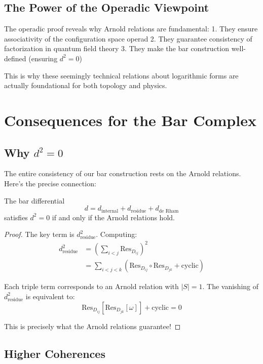 \subsection{The Power of the Operadic Viewpoint}

The operadic proof reveals why Arnold relations are fundamental:
1. They ensure associativity of the configuration space operad
2. They guarantee consistency of factorization in quantum field theory
3. They make the bar construction well-defined (ensuring $d^2 = 0$)

This is why these seemingly technical relations about logarithmic forms are actually foundational for both topology and physics.

\section{Consequences for the Bar Complex}

\subsection{Why $d^2 = 0$}

The entire consistency of our bar construction rests on the Arnold relations. Here's the precise connection:

\begin{theorem}
The bar differential 
$$d = d_{\text{internal}} + d_{\text{residue}} + d_{\text{de Rham}}$$
satisfies $d^2 = 0$ if and only if the Arnold relations hold.
\end{theorem}

\begin{proof}
The key term is $d_{\text{residue}}^2$. Computing:
\begin{align}
d_{\text{residue}}^2 &= \left(\sum_{i<j} \text{Res}_{D_{ij}}\right)^2 \\
&= \sum_{i<j<k} \left(\text{Res}_{D_{ij}} \circ \text{Res}_{D_{jk}} + \text{cyclic}\right)
\end{align}

Each triple term corresponds to an Arnold relation with $|S| = 1$. The vanishing of $d_{\text{residue}}^2$ is equivalent to:
$$\text{Res}_{D_{ij}}[\text{Res}_{D_{jk}}[\omega]] + \text{cyclic} = 0$$

This is precisely what the Arnold relations guarantee!
\end{proof}

\subsection{Higher Coherences}

